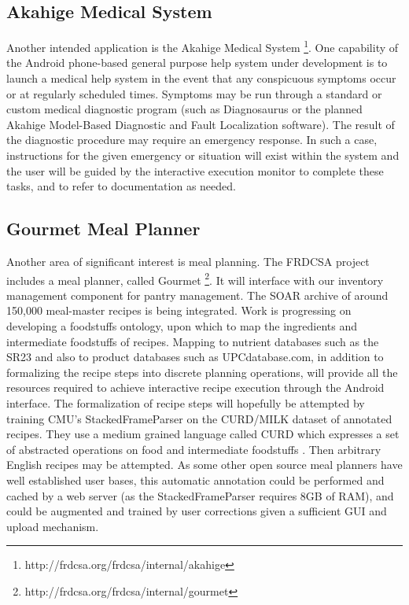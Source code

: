 \documentclass[letterpaper]{article}
\begin{document}
\subsection{Akahige Medical System}
Another intended application is the Akahige Medical System
\footnote{http://frdcsa.org/frdcsa/internal/akahige}.  One capability
of the Android phone-based general purpose help system under
development is to launch a medical help system in the event that any
conspicuous symptoms occur or at regularly scheduled times.  Symptoms
may be run through a standard or custom medical diagnostic program
(such as Diagnosaurus or the planned Akahige Model-Based Diagnostic
and Fault Localization software).  The result of the diagnostic
procedure may require an emergency response.  In such a case,
instructions for the given emergency or situation will exist within
the system and the user will be guided by the interactive execution
monitor to complete these tasks, and to refer to documentation as
needed.

\subsection{Gourmet Meal Planner}

Another area of significant interest is meal planning.  The FRDCSA
project includes a meal planner, called Gourmet
\footnote{http://frdcsa.org/frdcsa/internal/gourmet}. It will
interface with our inventory management component for pantry
management.  The SOAR archive of around 150,000 meal-master recipes is
being integrated.  Work is progressing on developing a foodstuffs
ontology, upon which to map the ingredients and intermediate
foodstuffs of recipes.  Mapping to nutrient databases such as the SR23
and also to product databases such as UPCdatabase.com, in addition to
formalizing the recipe steps into discrete planning operations, will
provide all the resources required to achieve interactive recipe
execution through the Android interface.  The formalization of recipe
steps will hopefully be attempted by training CMU's StackedFrameParser
on the CURD/MILK dataset of annotated recipes.  They use a medium
grained language called CURD which expresses a set of abstracted
operations on food and intermediate foodstuffs \cite{tasse2008}.  Then
arbitrary English recipes may be attempted.  As some other open source
meal planners have well established user bases, this automatic
annotation could be performed and cached by a web server (as the
StackedFrameParser requires 8GB of RAM), and could be augmented and
trained by user corrections given a sufficient GUI and upload
mechanism.
\end{document}
